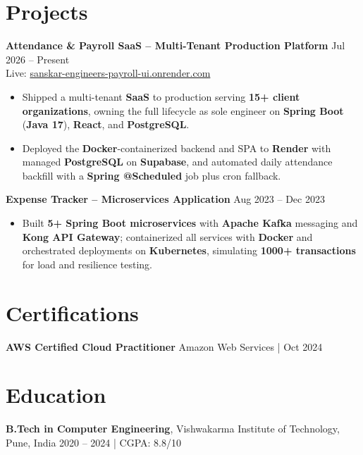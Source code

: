 \documentclass[a4paper,10pt]{article}
\begin{document}
\section*{Projects}

\textbf{Attendance \& Payroll SaaS -- Multi-Tenant Production Platform} \hfill Jul 2026 -- Present \\
Live: \href{https://sanskar-engineers-payroll-ui.onrender.com/login}{sanskar-engineers-payroll-ui.onrender.com}
\begin{itemize}[leftmargin=*]
    \item Shipped a multi-tenant \textbf{SaaS} to production serving \textbf{15+ client organizations}, owning the full lifecycle as sole engineer on \textbf{Spring Boot} (\textbf{Java 17}), \textbf{React}, and \textbf{PostgreSQL}.
    \item Deployed the \textbf{Docker}-containerized backend and SPA to \textbf{Render} with managed \textbf{PostgreSQL} on \textbf{Supabase}, and automated daily attendance backfill with a \textbf{Spring @Scheduled} job plus cron fallback.
\end{itemize}

\textbf{Expense Tracker -- Microservices Application} \hfill Aug 2023 -- Dec 2023
\begin{itemize}[leftmargin=*]
    \item Built \textbf{5+ Spring Boot microservices} with \textbf{Apache Kafka} messaging and \textbf{Kong API Gateway}; containerized all services with \textbf{Docker} and orchestrated deployments on \textbf{Kubernetes}, simulating \textbf{1000+ transactions} for load and resilience testing.
\end{itemize}

\section*{Certifications}
\textbf{AWS Certified Cloud Practitioner} \hfill Amazon Web Services \;|\; Oct 2024

\section*{Education}
\textbf{B.Tech in Computer Engineering}, Vishwakarma Institute of Technology, Pune, India \hfill 2020 -- 2024 \;|\; CGPA: 8.8/10
\end{document}
